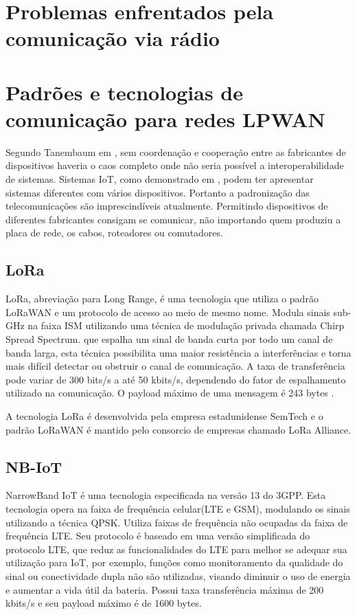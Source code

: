 \section{Problemas enfrentados pela comunicação via rádio}


\section{Padrões e tecnologias de comunicação para redes LPWAN}
\label{padrõesSF}
Segundo Tanembaum em \cite{tanembaum2011}, sem coordenação e cooperação entre as fabricantes de dispositivos haveria o caos completo onde não seria possível a interoperabilidade de sistemas. Sistemas IoT, como demonstrado em \cite{sotres2017practical}, podem ter apresentar sistemas diferentes com vários dispositivos. Portanto a padronização das telecomunicações são imprescindíveis atualmente. Permitindo dispositivos de diferentes fabricantes consigam se comunicar, não importando quem produziu a placa de rede, os cabos, roteadores ou comutadores.

\subsection{LoRa}
LoRa, abreviação para Long Range, é uma tecnologia que utiliza o padrão LoRaWAN e um protocolo de acesso ao meio de mesmo nome. Modula sinais sub-GHz na faixa ISM utilizando uma técnica de modulação  privada chamada Chirp Spread Spectrum. que espalha um sinal de banda curta por todo um canal de banda larga, esta técnica possibilita uma maior resistência a interferências e torna mais difícil detectar ou obstruir o canal de comunicação. A taxa de transferência pode variar de 300 bits/s a até 50 kbits/s, dependendo do fator de espalhamento utilizado na comunicação. O payload máximo de uma mensagem é 243 bytes \cite{mekki2019comparative}.

A tecnologia LoRa é desenvolvida pela empresa estadunidense SemTech e o padrão LoRaWAN é mantido pelo consorcio de empresas chamado LoRa Alliance.

\subsection{NB-IoT}
NarrowBand IoT é uma tecnologia especificada na versão 13 do 3GPP. Esta tecnologia opera na faixa de frequência celular(LTE e GSM), modulando os sinais utilizando a técnica QPSK. Utiliza faixas de frequência não ocupadas da faixa de frequência LTE. Seu protocolo é baseado em uma versão simplificada do protocolo LTE, que reduz as funcionalidades do LTE para melhor se adequar sua utilização para IoT, por exemplo, funções como monitoramento da qualidade do sinal ou conectividade dupla não são utilizadas, visando diminuir o uso de energia e aumentar a vida útil da bateria. Possui taxa transferência máxima de 200 kbits/s e seu payload máximo é de 1600 bytes.


